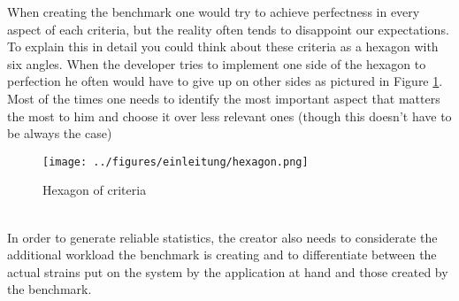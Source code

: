 When creating the benchmark one would try to achieve perfectness in every aspect of each criteria, but the reality often tends to disappoint our expectations. To explain this in detail you could think about these criteria as a hexagon with six angles. When the developer tries to implement one side of the hexagon to perfection he often would have to give up on other sides as pictured in Figure \ref{hexagon_criterias}. Most of the times one needs to identify the most important aspect that matters the most to him and choose it over less relevant ones (though this doesn't have to be always the case)
\begin{figure}[htbp]
	\centering
	\texttt{[image: ../figures/einleitung/hexagon.png]}
	\caption{Hexagon of criteria}
	\label{hexagon_criterias}
\end{figure}
\\In order to generate reliable statistics, the creator also needs to considerate the additional workload the benchmark is creating and to differentiate between the actual strains put on the system by the application at hand and those created by the benchmark. 
